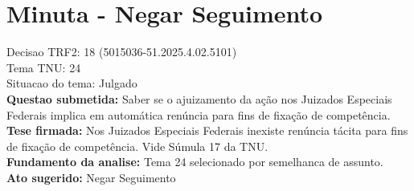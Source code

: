 \documentclass{article}
\begin{document}
\section*{Minuta - Negar Seguimento}
Decisao TRF2: 18 (5015036-51.2025.4.02.5101)\\
Tema TNU: 24\\
Situacao do tema: Julgado\\
\textbf{Questao submetida:} Saber se o ajuizamento da ação nos Juizados Especiais Federais implica em automática renúncia para fins de fixação de competência.\\
\textbf{Tese firmada:} Nos Juizados Especiais Federais inexiste renúncia tácita para fins de fixação de competência. Vide Súmula 17 da TNU.\\
\textbf{Fundamento da analise:} Tema 24 selecionado por semelhanca de assunto.\\
\textbf{Ato sugerido:} Negar Seguimento
\end{document}
